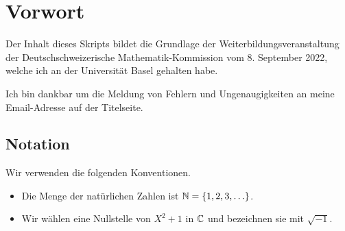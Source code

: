 \chapter{Vorwort}

Der Inhalt dieses Skripts bildet die Grundlage der
Weiterbildungsveranstaltung der Deutschschweizerische
Mathematik-Kommission vom 8. September 2022, welche ich an der
Universität Basel gehalten habe.

Ich bin dankbar um die Meldung von Fehlern und Ungenaugigkeiten an
meine Email-Adresse auf der Titelseite.

\section{Notation}

Wir verwenden die folgenden Konventionen.

\begin{itemize}
\item Die Menge der natürlichen Zahlen ist ${\mathbb{N}} = \{1,2,3,\ldots\}$.

\item Wir wählen eine Nullstelle von $X^2+1$ in ${\mathbb{C}}$ und bezeichnen sie
  mit $\sqrt{-1}$.
  
\end{itemize}


